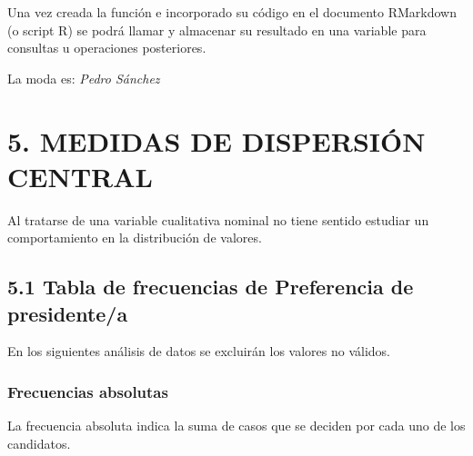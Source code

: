 \documentclass[
  12 pt,
  a4paper,
]{article}
\newenvironment{Shaded}{\begin{snugshade}}{\end{snugshade}}
\newcommand{\AttributeTok}[1]{\textcolor[rgb]{0.13,0.29,0.53}{#1}}
\newcommand{\CommentTok}[1]{\textcolor[rgb]{0.56,0.35,0.01}{\textit{#1}}}
\newcommand{\FunctionTok}[1]{\textcolor[rgb]{0.13,0.29,0.53}{\textbf{#1}}}
\newcommand{\NormalTok}[1]{#1}
\newcommand{\OtherTok}[1]{\textcolor[rgb]{0.56,0.35,0.01}{#1}}
\newcommand{\SpecialCharTok}[1]{\textcolor[rgb]{0.81,0.36,0.00}{\textbf{#1}}}
\newcommand{\StringTok}[1]{\textcolor[rgb]{0.31,0.60,0.02}{#1}}
\begin{document}
Una vez creada la función e incorporado su código en el documento
RMarkdown (o script R) se podrá llamar y almacenar su resultado en una
variable para consultas u operaciones posteriores.

\begin{Shaded}
\end{Shaded}

La moda es: \emph{Pedro Sánchez}

\newpage

\hypertarget{medidas-de-dispersiuxf3n-central}{%
\section{5. MEDIDAS DE DISPERSIÓN
CENTRAL}\label{medidas-de-dispersiuxf3n-central}}

Al tratarse de una variable cualitativa nominal no tiene sentido
estudiar un comportamiento en la distribución de valores.

\hypertarget{tabla-de-frecuencias-de-preferencia-de-presidentea}{%
\subsection{5.1 Tabla de frecuencias de Preferencia de
presidente/a}\label{tabla-de-frecuencias-de-preferencia-de-presidentea}}

En los siguientes análisis de datos se excluirán los valores no válidos.

\hypertarget{frecuencias-absolutas}{%
\subsubsection{Frecuencias absolutas}\label{frecuencias-absolutas}}

La frecuencia absoluta indica la suma de casos que se deciden por cada
uno de los candidatos.

\begin{Shaded}
\end{Shaded}
\end{document}

